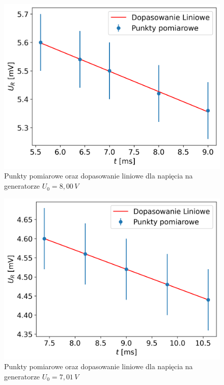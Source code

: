 \documentclass[12pt]{article}
\begin{document}
\begin{figure}[H]
    \centering
    \includegraphics[scale=0.58]{nachylenie_3}
    \caption{Punkty pomiarowe oraz dopasowanie liniowe dla napięcia na generatorze $U_0 = 8{,}00 \, V$}
\end{figure}
\begin{figure}[H]
    \centering
    \includegraphics[scale=0.58]{nachylenie_4}
    \caption{Punkty pomiarowe oraz dopasowanie liniowe dla napięcia na generatorze $U_0 = 7{,}01 \, V$}
\end{figure}
\end{document}
